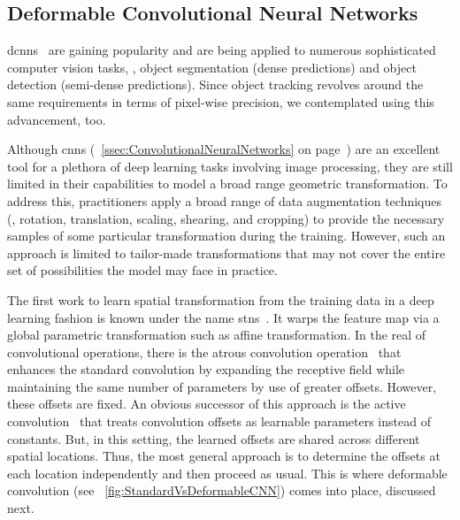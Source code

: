\subsection{Deformable Convolutional Neural Networks}
\label{ssec:DeformableCNNs}

\Glspl{dcnn}~\cite{dai2017dcnn} are gaining popularity and are being applied to numerous sophisticated computer vision tasks, \egtext{}, object segmentation (dense predictions) and object detection (semi-dense predictions). Since object tracking revolves around the same requirements in terms of pixel-wise precision, we contemplated using this advancement, too.

Although \glspl{cnn} (\sectiontext{}~\ref{ssec:ConvolutionalNeuralNetworks} on page~\pageref{ssec:ConvolutionalNeuralNetworks}) are an excellent tool for a plethora of deep learning tasks involving image processing, they are still limited in their capabilities to model a broad range geometric transformation. To address this, practitioners apply a broad range of data augmentation techniques (\egtext{}, rotation, translation, scaling, shearing, and cropping) to provide the necessary samples of some particular transformation during the training. However, such an approach is limited to tailor-made transformations that may not cover the entire set of possibilities the model may face in practice.

The first work to learn spatial transformation from the training data in a deep learning fashion is known under the name \glspl{stn}~\cite{jaderberg2016stn}. It warps the feature map via a global parametric transformation such as affine transformation. In the real of convolutional operations, there is the atrous convolution operation~\cite{holschneider1990atrousconv} that enhances the standard convolution by expanding the receptive field while maintaining the same number of parameters by use of greater offsets. However, these offsets are fixed. An obvious successor of this approach is the active convolution~\cite{jeon2017activeconv} that treats convolution offsets as learnable parameters instead of constants. But, in this setting, the learned offsets are shared across different spatial locations. Thus, the most general approach is to determine the offsets at each location independently and then proceed as usual. This is where deformable convolution (see \figtext{}~\ref{fig:StandardVsDeformableCNN}) comes into place, discussed next.


